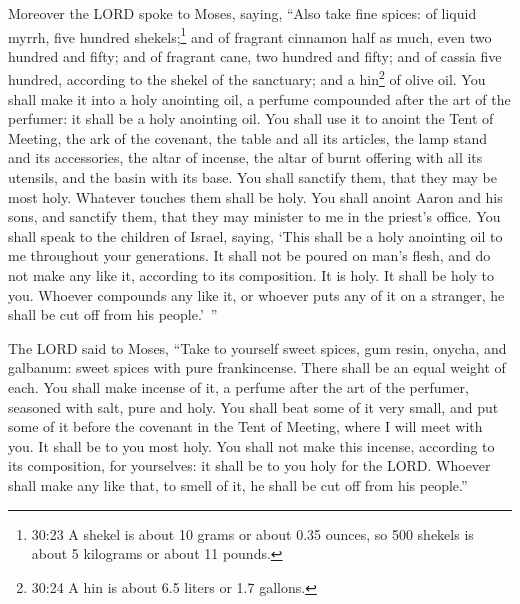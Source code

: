 \myverse{}Moreover the LORD spoke to Moses, saying,
\myverse{}“Also take fine spices: of liquid myrrh, five hundred shekels;\footnote{30:23 A shekel is about 10 grams or about 0.35 ounces, so 500 shekels is about 5 kilograms or about
	11 pounds.} and of fragrant cinnamon half as much, even two hundred and fifty; and of fragrant
cane, two hundred and fifty;
\myverse{}and of cassia five hundred, according to the shekel of the sanctuary; and
a hin\footnote{30:24 A hin is about 6.5 liters or 1.7 gallons.} of olive oil.
\myverse{}You shall make it into a holy anointing oil, a perfume compounded after the
art of the perfumer: it shall be a holy anointing oil.
\myverse{}You shall use it to anoint the Tent of Meeting, the ark of the covenant,
\myverse{}the table and all its articles, the lamp stand and its accessories, the altar
of incense,
\myverse{}the altar of burnt offering with all its utensils, and the basin with its
base.
\myverse{}You shall sanctify them, that they may be most holy. Whatever touches them
shall be holy.
\myverse{}You shall anoint Aaron and his sons, and sanctify them, that they may minister
to me in the priest’s office.
\myverse{}You shall speak to the children of Israel, saying, ‘This shall be a holy
anointing oil to me throughout your generations.
\myverse{}It shall not be poured on man’s flesh, and do not make any like it, according
to its composition. It is holy. It shall be holy to you.
\myverse{}Whoever compounds any like it, or whoever puts any of it on a stranger, he
shall be cut off from his people.’ ”


\myverse{}The LORD said to Moses, “Take to yourself sweet spices, gum
resin, onycha, and galbanum: sweet spices with pure frankincense. There shall be an equal weight of each.
\myverse{}You shall make incense of it, a perfume after the art of the perfumer, seasoned
with salt, pure and holy.
\myverse{}You shall beat some of it very small, and put some of it before the covenant
in the Tent of Meeting, where I will meet with you. It shall be to you most holy.
\myverse{}You shall not make this incense, according to its composition, for yourselves:
it shall be to you holy for the LORD.
\myverse{}Whoever shall make any like that, to smell of it, he shall be cut off from
his people.”


